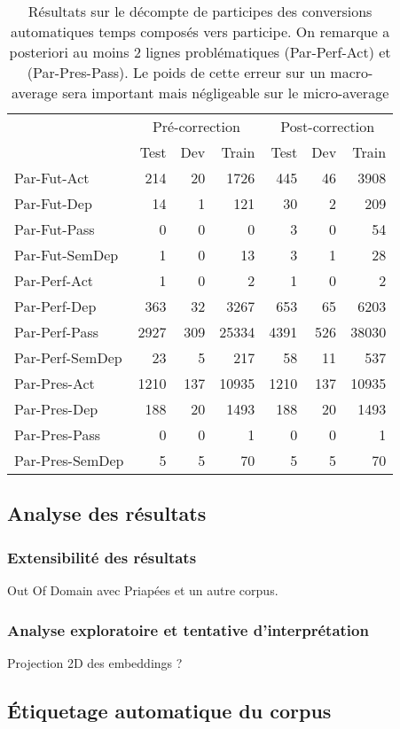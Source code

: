 \begin{table}[]
\centering
\begin{tabular}{l|rrr|rrr}
\toprule
 & \multicolumn{3}{c}{Pré-correction} & \multicolumn{3}{c}{Post-correction} \\ 
 & Test & Dev & Train & Test & Dev & Train \\ \midrule
Par-Fut-Act & 214 & 20 & 1726 & 445 & 46 & 3908 \\
Par-Fut-Dep & 14 & 1 & 121 & 30 & 2 & 209 \\
Par-Fut-Pass & 0 & 0 & 0 & 3 & 0 & 54 \\
Par-Fut-SemDep & 1 & 0 & 13 & 3 & 1 & 28 \\
Par-Perf-Act & 1 & 0 & 2 & 1 & 0 & 2 \\
Par-Perf-Dep & 363 & 32 & 3267 & 653 & 65 & 6203 \\
Par-Perf-Pass & 2927 & 309 & 25334 & 4391 & 526 & 38030 \\
Par-Perf-SemDep & 23 & 5 & 217 & 58 & 11 & 537 \\
Par-Pres-Act & 1210 & 137 & 10935 & 1210 & 137 & 10935 \\
Par-Pres-Dep & 188 & 20 & 1493 & 188 & 20 & 1493 \\
Par-Pres-Pass & 0 & 0 & 1 & 0 & 0 & 1 \\
Par-Pres-SemDep & 5 & 5 & 70 & 5 & 5 & 70 \\ \bottomrule
\end{tabular}
\label{table:lasla:correction-temps}
\caption{Résultats sur le décompte de participes des conversions automatiques temps composés vers participe. On remarque a posteriori au moins 2 lignes problématiques (Par-Perf-Act) et (Par-Pres-Pass). Le poids de cette erreur sur un macro-average sera important mais négligeable sur le micro-average}
\end{table}

\subsection{Analyse des résultats}
\label{subsec:lemma_resultats}

\subsubsection{Extensibilité des résultats}

Out Of Domain avec Priapées et un autre corpus.

\subsubsection{Analyse exploratoire et tentative d'interprétation}

Projection 2D des embeddings ?

\subsection{Étiquetage automatique du corpus}